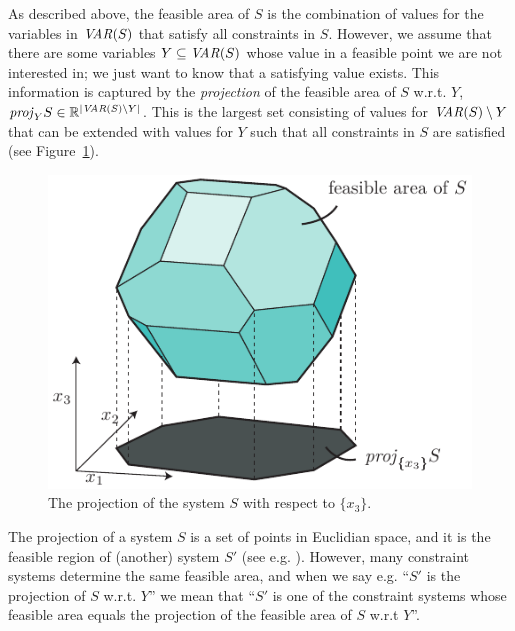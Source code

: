 As described above, the feasible area of $S$ is the combination of values for the variables in $\mathit{VAR}(S)$ that satisfy all constraints in $S$. However, we assume that there are some variables $Y\subseteq \mathit{VAR}(S)$ whose value in a feasible point we are not interested in; we just want to know that a satisfying value exists. This information is captured by the \emph{projection} of the feasible area of $S$ w.r.t. $Y$, $\mathit{proj}_YS\in\mathbb{R}^{|\mathit{VAR}(S)\setminus Y|}$. This is the largest set consisting of values for $\mathit{VAR}(S)\setminus Y$ that can be extended with values for $Y$ such that all constraints in $S$ are satisfied (see Figure~\ref{fig:proj}). 

\begin{figure}
	\centering
		\includegraphics[scale=0.8]{figures/projection2.pdf}
	\caption{The projection of the system $S$ with respect to $\{x_3\}$.}
	\label{fig:proj}
\end{figure}

The projection of a system $S$ is a set of points in Euclidian space, and it is the feasible region of (another) system $S'$ (see e.g. \cite{ziegler95}). However, many constraint systems determine the same feasible area, and when we say e.g. ``$S'$ is the projection of $S$ w.r.t. $Y$'' we mean that ``$S'$ is one of the constraint systems whose feasible area equals the projection of the feasible area of $S$ w.r.t $Y$''.

